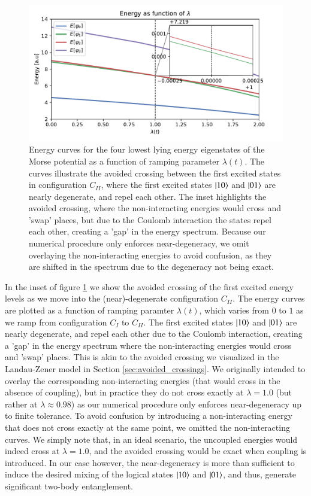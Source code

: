 \documentclass{subfiles}
\begin{document}
\begin{figure}[h!]
  \centering
  \includegraphics[width=1.0\textwidth]{figs/energy_curves_avoided_crossing.pdf}
  \caption{Energy curves for the four lowest lying energy eigenstates of the Morse potential as a function of ramping parameter $\lambda(t)$. The curves illustrate the avoided crossing between the first excited states in configuration $C_{II}$, where the first excited states $\ket{10}$ and $\ket{01}$ are nearly degenerate, and repel each other. The inset highlights the avoided crossing, where the non-interacting energies would cross and 'swap' places, but due to the Coulomb interaction the states repel each other, creating a 'gap' in the energy spectrum. Because our numerical procedure only enforces near-degeneracy, we omit overlaying the non-interacting energies to avoid confusion, as they are shifted in the spectrum due to the degeneracy not being exact. }
  \label{fig:energy_curves_avoided_crossing}
\end{figure}
In the inset of figure \ref{fig:energy_curves_avoided_crossing} we show the avoided crossing of the first excited energy levels as we move into the (near)-degenerate configuration $C_{II}$. The energy curves are plotted as a function of ramping paramter $\lambda(t)$, which varies from $0$ to $1$ as we ramp from configuration $C_I$ to $C_{II}$. The first excited states $\ket{10}$ and $\ket{01}$ are nearly degenerate, and repel each other due to the Coulomb interaction, creating a 'gap' in the energy spectrum where the non-interacting energies would cross and 'swap' places. This is akin to the avoided crossing we visualized in the Landau-Zener model in Section \ref{sec:avoided_crossings}. We originally intended to overlay the corresponding non-interacting energies (that would cross in the absence of coupling), but in practice they do not cross exactly at $\lambda = 1.0$ (but rather at $\lambda \approx 0.98$) as our numerical procedure only enforces near-degeneracy up to finite tolerance. To avoid confusion by introducing a non-interacting energy that does not cross exactly at the same point, we omitted the non-interacting curves. We simply note that, in an ideal scenario, the uncoupled energies would indeed cross at $\lambda = 1.0$, and the avoided crossing would be exact when coupling is introduced. In our case however, the near-degeneracy is more than sufficient to induce the desired mixing of the logical states $\ket{10}$ and $\ket{01}$, and thus, generate significant two-body entanglement.
\\
\end{document}
